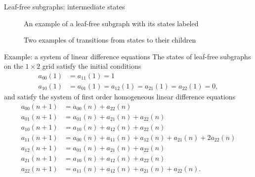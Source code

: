 \documentclass{beamer}%
\newcommand\indxx[2]{#1#2}
\begin{document}
\begin{frame}{Leaf-free subgraphs: intermediate states}
  \begin{figure}[ht!]
    
    \caption{An example of a leaf-free subgraph with its states labeled}
  \end{figure}
  \begin{figure}[ht!]
    
    \caption{Two examples of transitions from states to their children}
  \end{figure}
\end{frame}
%
\begin{frame}{Example: a system of linear difference equations}
  The states of leaf-free subgraphs on the $1 \times 2$ grid satisfy the initial
  conditions
  \begin{align*}
    a_{\indxx 00}(1) &= a_{\indxx 11}(1) = 1 \\
    a_{\indxx 10}(1) &= a_{\indxx 01}(1) = a_{\indxx 12}(1) = a_{\indxx 21}(1) = a_{\indxx 22}(1) = 0,
  \end{align*}
  and satisfy the system of first order homogeneous linear difference equations
  \begin{align*}
    a_{\indxx 00}(n + 1) &= a_{\indxx 00}(n) + a_{\indxx 22}(n) \\
    a_{\indxx 01}(n + 1) &= a_{\indxx 01}(n) + a_{\indxx 21}(n) + a_{\indxx 22}(n) \\
    a_{\indxx 10}(n + 1) &= a_{\indxx 10}(n) + a_{\indxx 12}(n) + a_{\indxx 22}(n) \\
    a_{\indxx 11}(n + 1) &= a_{\indxx 00}(n) + a_{\indxx 11}(n) + a_{\indxx 12}(n)
                      + a_{\indxx 21}(n) + 2a_{\indxx 22}(n) \\
    a_{\indxx 12}(n + 1) &= a_{\indxx 01}(n) + a_{\indxx 21}(n) + a_{\indxx 22}(n) \\
    a_{\indxx 21}(n + 1) &= a_{\indxx 10}(n) + a_{\indxx 12}(n) + a_{\indxx 22}(n) \\
    a_{\indxx 22}(n + 1) &= a_{\indxx 11}(n) + a_{\indxx 12}(n) + a_{\indxx 21}(n) + a_{\indxx 22}(n).
  \end{align*}
\end{frame}
\end{document}
